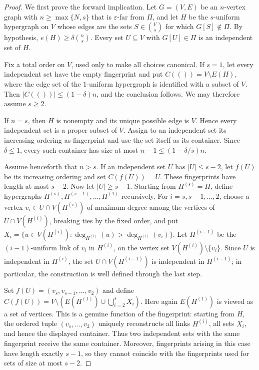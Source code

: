 \documentclass[10pt,a4paper]{amsart}
\begin{document}
\begin{proof}
We first prove the forward implication.  Let $G=(V,E)$ be an $n$-vertex graph
with $n\geq\max\{N,s\}$ that is $\varepsilon$-far from $\Pi$, and let $H$ be the
$s$-uniform hypergraph on $V$ whose edges are the sets $S\in\binom Vs$ for
which $G[S]\notin\Pi$.  By hypothesis,
$e(H)\geq\delta\binom ns$.  Every set $U\subseteq V$ with $G[U]\in\Pi$ is an
independent set of $H$.

Fix a total order on $V$, used only to make all choices canonical.  If $s=1$,
let every independent set have the empty fingerprint and put
$C(())=V\setminus E(H)$, where the edge set of the $1$-uniform hypergraph is
identified with a subset of $V$.  Then
$|C(())|\leq(1-\delta)n$, and the conclusion follows.  We may therefore assume
$s\geq2$.

If $n=s$, then $H$ is nonempty and its unique possible edge is $V$.  Hence
every independent set is a proper subset of $V$.  Assign to an independent set
its increasing ordering as fingerprint and use the set itself as its
container.  Since $\delta\leq1$, every such container has size at most
$n-1\leq(1-\delta/s)n$.

Assume henceforth that $n>s$.  If an independent set $U$ has
$|U|\leq s-2$, let $f(U)$ be its increasing ordering and set $C(f(U))=U$.
These fingerprints have length at most $s-2$.  Now let $|U|\geq s-1$.
Starting from $H^{(s)}=H$, define hypergraphs
$H^{(s)},H^{(s-1)},\ldots,H^{(1)}$ recursively.  For
$i=s,s-1,\ldots,2$, choose a vertex
$v_i\in U\cap V(H^{(i)})$ of maximum degree among the vertices of
$U\cap V(H^{(i)})$, breaking ties by the fixed order, and put
\(X_i=\{u\in V(H^{(i)}): \deg_{H^{(i)}}(u)>\deg_{H^{(i)}}(v_i)\}.\)
Let $H^{(i-1)}$ be the $(i-1)$-uniform link of $v_i$ in $H^{(i)}$, on the
vertex set $V(H^{(i)})\setminus\{v_i\}$.  Since $U$ is independent in
$H^{(i)}$, the set $U\cap V(H^{(i-1)})$ is independent in $H^{(i-1)}$; in
particular, the construction is well defined through the last step.

Set
\(f(U)=(v_s,v_{s-1},\ldots,v_2)
\)
and define
\(C(f(U)) =V\setminus\left(E(H^{(1)})\cup\bigcup_{i=2}^{s}X_i\right).\)
Here again $E(H^{(1)})$ is viewed as a set of vertices.  This is a genuine
function of the fingerprint: starting from $H$, the ordered tuple
$(v_s,\ldots,v_2)$ uniquely reconstructs all links $H^{(i)}$, all sets $X_i$,
and hence the displayed container.  Thus two independent sets with the same
fingerprint receive the same container.  Moreover, fingerprints arising in
this case have length exactly $s-1$, so they cannot coincide with the
fingerprints used for sets of size at most $s-2$.


\end{proof}
\end{document}
